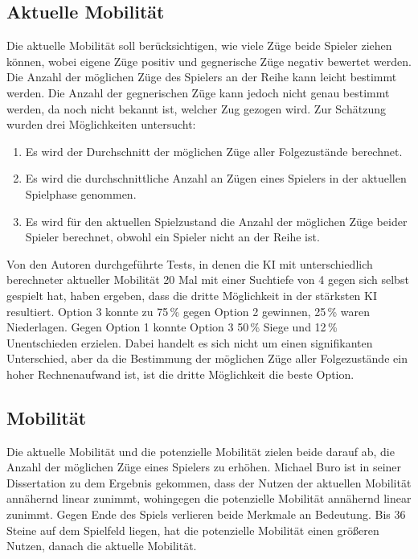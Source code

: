 \subsection{Aktuelle Mobilität}
\label{sec:currentmobility}
Die aktuelle Mobilität soll berücksichtigen, wie viele Züge beide Spieler ziehen können, wobei eigene Züge positiv und
gegnerische Züge negativ bewertet werden. Die Anzahl der möglichen Züge des Spielers an der Reihe kann leicht bestimmt
werden. Die Anzahl der gegnerischen Züge kann jedoch nicht genau bestimmt werden, da noch nicht bekannt ist, welcher Zug
gezogen wird. Zur Schätzung wurden drei Möglichkeiten untersucht:
\begin{enumerate}
    \item Es wird der Durchschnitt der möglichen Züge aller Folgezustände berechnet.
    \item Es wird die durchschnittliche Anzahl an Zügen eines Spielers in der aktuellen Spielphase genommen.
    \item Es wird für den aktuellen Spielzustand die Anzahl der möglichen Züge beider Spieler berechnet, obwohl ein
    Spieler nicht an der Reihe ist.
\end{enumerate}
Von den Autoren durchgeführte Tests, in denen die KI mit unterschiedlich berechneter aktueller Mobilität 20 Mal mit einer Suchtiefe von 4 gegen sich
selbst gespielt hat, haben ergeben, dass die dritte Möglichkeit in der stärksten KI resultiert. Option 3 konnte zu
75\,\% gegen Option 2 gewinnen, 25\,\% waren Niederlagen. Gegen Option 1 konnte Option 3 50\,\% Siege und 12\,\%
Unentschieden erzielen. Dabei handelt es sich nicht um einen signifikanten Unterschied, aber da die Bestimmung der
möglichen Züge aller Folgezustände ein hoher Rechnenaufwand ist, ist die dritte Möglichkeit die beste Option.

\subsection{Mobilität}
\label{sec:combinedmobility}
Die aktuelle Mobilität und die potenzielle Mobilität zielen beide darauf ab, die Anzahl der möglichen Züge eines Spielers zu
erhöhen. Michael Buro ist in seiner Dissertation zu dem Ergebnis gekommen, dass der Nutzen der aktuellen Mobilität
annähernd linear zunimmt, wohingegen die potenzielle Mobilität annähernd linear zunimmt. Gegen Ende des Spiels verlieren
beide Merkmale an Bedeutung. Bis 36 Steine auf dem Spielfeld liegen, hat die potenzielle Mobilität einen größeren
Nutzen, danach die aktuelle Mobilität. \cite[S.~20]{evaluationfunctions}

